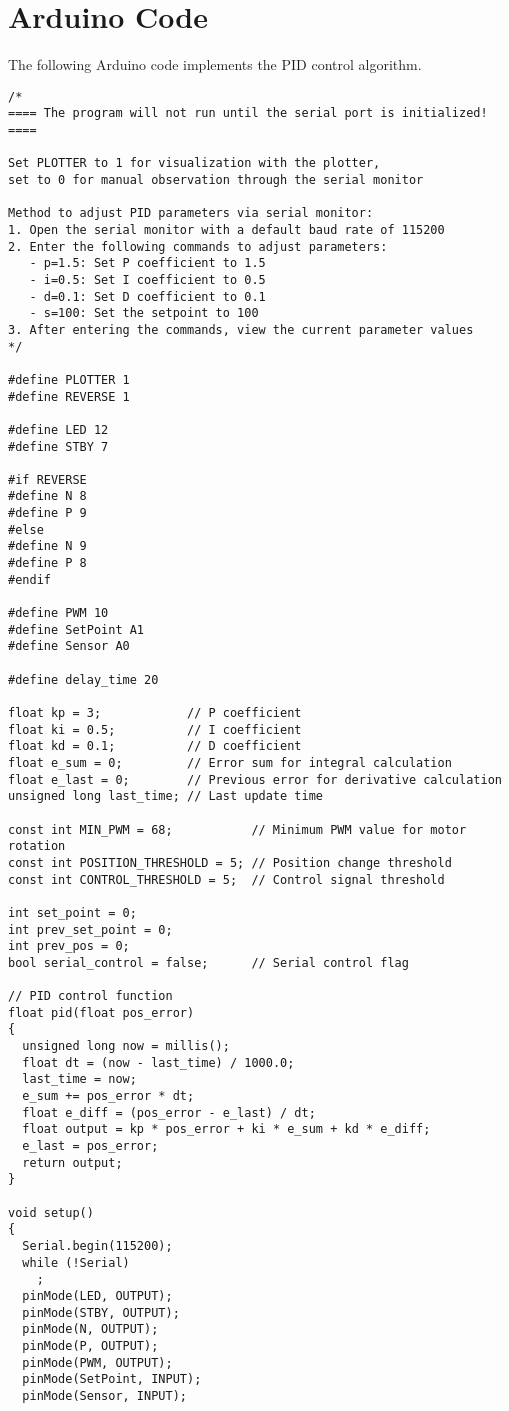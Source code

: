 \documentclass{article}
\begin{document}
\section{Arduino Code}
The following Arduino code implements the PID control algorithm.

\begin{verbatim}
/*
==== The program will not run until the serial port is initialized! ====

Set PLOTTER to 1 for visualization with the plotter, 
set to 0 for manual observation through the serial monitor

Method to adjust PID parameters via serial monitor:
1. Open the serial monitor with a default baud rate of 115200
2. Enter the following commands to adjust parameters:
   - p=1.5: Set P coefficient to 1.5
   - i=0.5: Set I coefficient to 0.5
   - d=0.1: Set D coefficient to 0.1
   - s=100: Set the setpoint to 100
3. After entering the commands, view the current parameter values
*/

#define PLOTTER 1
#define REVERSE 1 

#define LED 12
#define STBY 7

#if REVERSE
#define N 8
#define P 9
#else
#define N 9
#define P 8
#endif

#define PWM 10
#define SetPoint A1
#define Sensor A0

#define delay_time 20

float kp = 3;            // P coefficient
float ki = 0.5;          // I coefficient
float kd = 0.1;          // D coefficient
float e_sum = 0;         // Error sum for integral calculation
float e_last = 0;        // Previous error for derivative calculation
unsigned long last_time; // Last update time

const int MIN_PWM = 68;           // Minimum PWM value for motor rotation
const int POSITION_THRESHOLD = 5; // Position change threshold
const int CONTROL_THRESHOLD = 5;  // Control signal threshold

int set_point = 0;
int prev_set_point = 0;
int prev_pos = 0;
bool serial_control = false;      // Serial control flag

// PID control function
float pid(float pos_error)
{
  unsigned long now = millis();
  float dt = (now - last_time) / 1000.0;
  last_time = now;
  e_sum += pos_error * dt;
  float e_diff = (pos_error - e_last) / dt;
  float output = kp * pos_error + ki * e_sum + kd * e_diff;
  e_last = pos_error;
  return output;
}

void setup()
{
  Serial.begin(115200);
  while (!Serial)
    ;
  pinMode(LED, OUTPUT);
  pinMode(STBY, OUTPUT);
  pinMode(N, OUTPUT);
  pinMode(P, OUTPUT);
  pinMode(PWM, OUTPUT);
  pinMode(SetPoint, INPUT);
  pinMode(Sensor, INPUT);


\end{verbatim}
\end{document}

